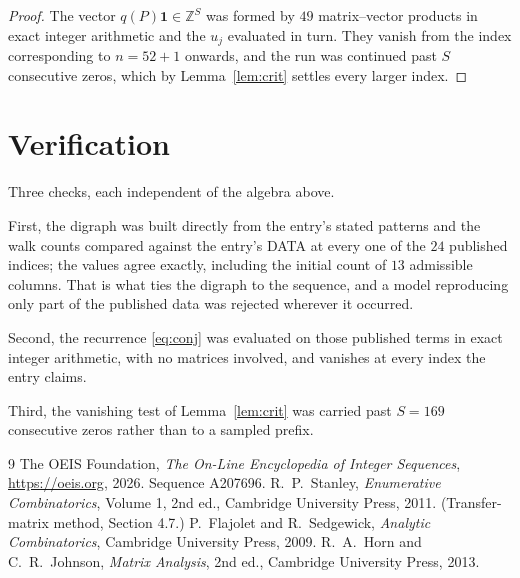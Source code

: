 \documentclass[11pt,a4paper]{article}
\theoremstyle{plain}
\theoremstyle{definition}
\begin{document}
\begin{proof}
The vector $q(P)\mathbf{1}\in\mathbb{Z}^{S}$ was formed by $49$ matrix--vector
products in exact integer arithmetic and the $u_j$ evaluated in turn. They vanish from the
index corresponding to $n=52+1$ onwards, and the run was continued past $S$ consecutive
zeros, which by Lemma~\ref{lem:crit} settles every larger index.
\end{proof}

\section{Verification}

Three checks, each independent of the algebra above.

First, the digraph was built directly from the entry's stated patterns and the walk counts
compared against the entry's DATA at every one of the $24$ published indices; the
values agree exactly, including the initial count of $13$ admissible columns. That is
what ties the digraph to the sequence, and a model reproducing only part of the published
data was rejected wherever it occurred.

Second, the recurrence \eqref{eq:conj} was evaluated on those published terms in exact
integer arithmetic, with no matrices involved, and vanishes at every index the entry claims.

Third, the vanishing test of Lemma~\ref{lem:crit} was carried past $S=169$ consecutive
zeros rather than to a sampled prefix.

\begin{thebibliography}{9}
 The OEIS Foundation, \emph{The On-Line Encyclopedia of Integer
Sequences}, \url{https://oeis.org}, 2026. Sequence A207696.
 R.~P.~Stanley, \emph{Enumerative Combinatorics}, Volume 1, 2nd ed.,
Cambridge University Press, 2011. (Transfer-matrix method, Section 4.7.)
 P.~Flajolet and R.~Sedgewick, \emph{Analytic Combinatorics}, Cambridge
University Press, 2009.
 R.~A.~Horn and C.~R.~Johnson, \emph{Matrix Analysis}, 2nd ed., Cambridge
University Press, 2013.
\end{thebibliography}
\end{document}
